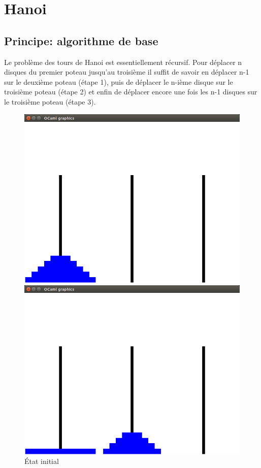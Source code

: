 \documentclass[a4paper, 11pt]{article}%
\begin{document}
\section{Hanoi}

	\subsection{Principe: algorithme de base}
		Le problème des tours de Hanoi est essentiellement récursif. Pour
		déplacer n disques du premier poteau jusqu'au troisième
		il suffit de savoir en déplacer n-1 sur le deuxième poteau (étape 1), puis
		de déplacer le n-ième disque sur le troisième poteau (étape 2) et enfin de
		déplacer encore une fois les n-1 disques sur le troisième poteau (étape 3).

		\begin{figure}[!h]
			  \includegraphics[width=\linewidth]{hanoi_start.png}
			  \caption{État initial}\label{fig:hanoi_start}
			\endminipage\hfill
			  \includegraphics[width=\linewidth]{hanoi_mid1.png}

\end{figure}
\end{document}

